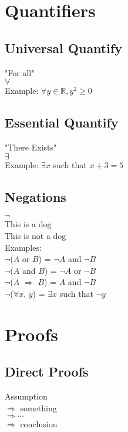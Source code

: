 \documentclass[11pt]{report}
\theoremstyle{remark}
\begin{document}
	\section{Quantifiers}

	\subsection{Universal Quantify}
	\begin{center}
		"For all"\\
		$\forall$\\
		Example: $\forall y \in \mathbb{R}, y^2 \geqslant 0$\\
	\end{center}
	\subsection{Essential Quantify}
	\begin{center}
		"There Exists"\\
		$\exists$\\
		Example: $\exists x$ such that $x + 3 = 5$\\
	\end{center}
	\subsection{Negations}
	\begin{center}
		$\neg$ \\ 
		This is a dog\\
		This is not a dog\\
		Examples: \\
		$\neg$($A$ or $B$) = $\neg A$ and $\neg B$ \\
		$\neg$($A$ and $B$) = $\neg A$ or $\neg B$ \\
		$\neg$($A$ $\Rightarrow$ $B$) = $A$ and $\neg B$ \\
		$\neg$($\forall x$, $y$) = $\exists x$ such that $\neg y$ \\

	\end{center}


	\section{Proofs}
	\subsection{Direct Proofs}
	\begin{center}
		Assumption\\ 
		$\Rightarrow$ something \\ 
		$\Rightarrow \cdots$ \\
		$\Rightarrow$ conclusion \\
	\end{center}
\end{document}
